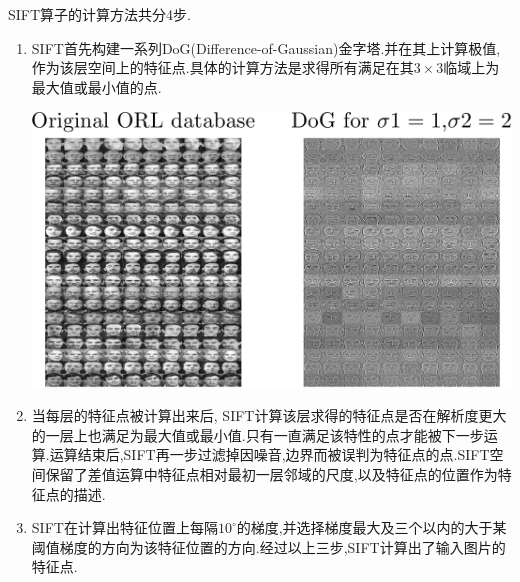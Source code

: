 SIFT算子的计算方法共分4步.
\begin{enumerate}
	\item SIFT首先构建一系列DoG(Difference-of-Gaussian)金字塔.并在其上计算极值,作为该层空间上的特征点.具体的计算方法是求得所有满足在其$3 \times 3$临域上为最大值或最小值的点. 

	 	\begin{center}
		\begin{minipage}[t]{\linewidth}
		\center
		{
		\includegraphics[width=\MyFactor\textwidth]{Img/c3/dog_demo} 
		}
		\end{minipage}
		\medskip
		\end{center}
	
	\item 当每层的特征点被计算出来后, SIFT计算该层求得的特征点是否在解析度更大的一层上也满足为最大值或最小值.只有一直满足该特性的点才能被下一步运算.运算结束后,SIFT再一步过滤掉因噪音,边界而被误判为特征点的点.SIFT空间保留了差值运算中特征点相对最初一层邻域的尺度,以及特征点的位置作为特征点的描述.
	\item SIFT在计算出特征位置上每隔$10^\circ$的梯度,并选择梯度最大及三个以内的大于某阈值梯度的方向为该特征位置的方向.经过以上三步,SIFT计算出了输入图片的特征点.
	

\end{enumerate}
